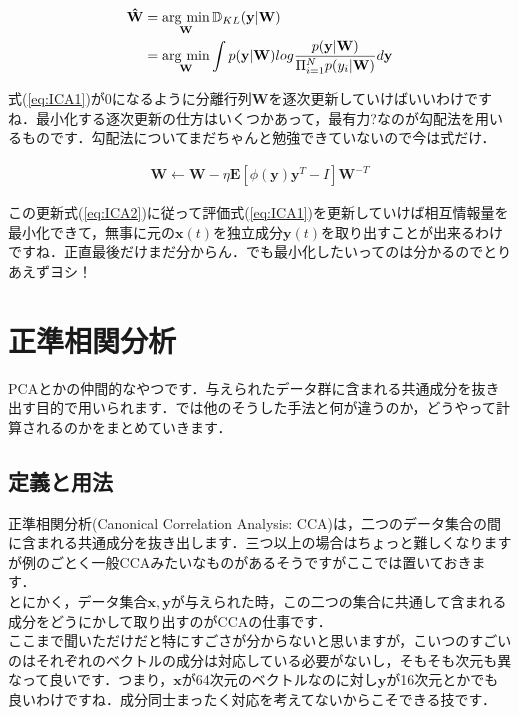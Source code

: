 \documentclass[11pt,a4paper,uplatex]{ujreport}
\newcommand{\argmin}{\mathop{\rm arg~min}\limits}
\begin{document}
\begin{align}
\label{eq:ICA2}
\mathbf{\hat W} &= \argmin_{\mathbf{W}} \mathbb{D}_{KL}(\mathbf{y}|\mathbf{W}) \nonumber \\
&= \argmin_{\mathbf{W}} \int p(\mathbf{y}|\mathbf{W}) log \frac{p(\mathbf{y}|\mathbf{W})}{\Pi_{i=1}^N p(y_i|\mathbf{W})} d\mathbf{y}
\end{align}

式(\ref{eq:ICA1})が0になるように分離行列$\mathbf{W}$を逐次更新していけばいいわけですね．最小化する逐次更新の仕方はいくつかあって，最有力?なのが勾配法を用いるものです．勾配法についてまだちゃんと勉強できていないので今は式だけ．

\begin{eqnarray}
\label{eq:ICA3}
\mathbf{W} \leftarrow \mathbf{W} - \eta \mathbf{E}[\phi (\mathbf{y})\mathbf{y}^T - I]\mathbf{W}^{-T}
\end{eqnarray}

この更新式(\ref{eq:ICA2})に従って評価式(\ref{eq:ICA1})を更新していけば相互情報量を最小化できて，無事に元の$\mathbf{x}(t)$を独立成分$\mathbf{y}(t)$を取り出すことが出来るわけですね．正直最後だけまだ分からん．でも最小化したいってのは分かるのでとりあえずヨシ！

\section{正準相関分析}
PCAとかの仲間的なやつです．与えられたデータ群に含まれる共通成分を抜き出す目的で用いられます．では他のそうした手法と何が違うのか，どうやって計算されるのかをまとめていきます．\\

\subsection{定義と用法}
正準相関分析(Canonical Correlation Analysis: CCA)は，二つのデータ集合の間に含まれる共通成分を抜き出します．三つ以上の場合はちょっと難しくなりますが例のごとく一般CCAみたいなものがあるそうですがここでは置いておきます．\\

とにかく，データ集合$\bm{x}, \bm{y}$が与えられた時，この二つの集合に共通して含まれる成分をどうにかして取り出すのがCCAの仕事です．\\

ここまで聞いただけだと特にすごさが分からないと思いますが，こいつのすごいのはそれぞれのベクトルの成分は対応している必要がないし，そもそも次元も異なって良いです．つまり，$\bm{x}$が64次元のベクトルなのに対し$\bm{y}$が16次元とかでも良いわけですね．成分同士まったく対応を考えてないからこそできる技です．\\
\\
\end{document}
